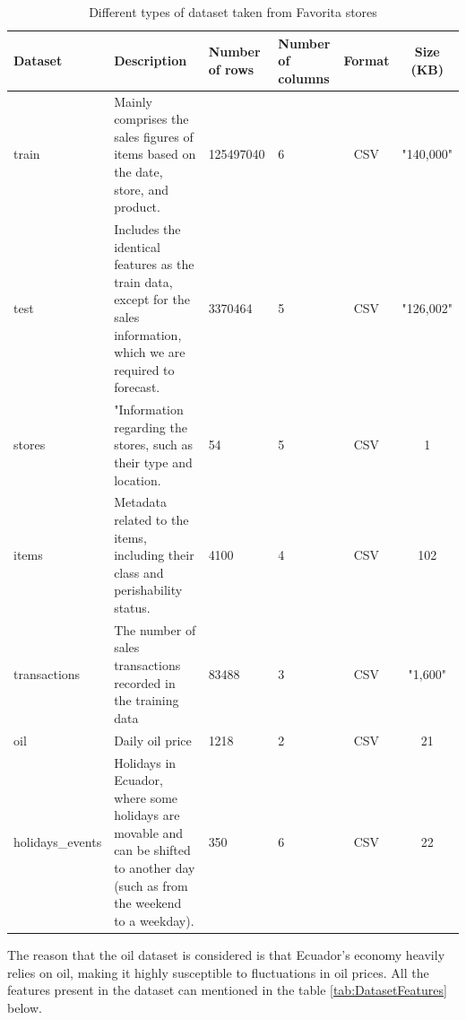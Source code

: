 \begin{table}[p]
	\centering
	\caption{Different types of dataset taken from Favorita stores}
	\label{tab:DatasetType}
	\begin{tabular}{|p{2cm}|p{3cm}|p{2.5cm}|p{2cm}|c|c|}
		\hline
		\textbf{Dataset} & \textbf{Description} & \textbf{Number of rows} & \textbf{Number of columns} & \textbf{Format} & \textbf{Size (KB)} \\ \hline
		train & Mainly comprises the sales figures of items based on the date, store, and product. & 125497040 & 6 & CSV & "140,000" \\ \hline
		test & Includes the identical features as the train data, except for the sales information, which we are required to forecast. & 3370464 & 5 & CSV & "126,002" \\ \hline
		stores & "Information regarding the stores, such as their type and location. & 54 & 5 & CSV & 1 \\ \hline
		items & Metadata related to the items, including their class and perishability status. & 4100 & 4 & CSV & 102 \\ \hline
		transactions & The number of sales transactions recorded in the training data & 83488 & 3 & CSV & "1,600" \\ \hline
		oil & Daily oil price & 1218 & 2 & CSV & 21 \\ \hline
		holidays\_events & Holidays in Ecuador, where some holidays are movable and can be shifted to another day (such as from the weekend to a weekday). & 350 & 6 & CSV & 22 \\ \hline
	\end{tabular}
\end{table}

The reason that the oil dataset is considered is that Ecuador's economy heavily relies on oil, making it highly susceptible to fluctuations in oil prices. All the features present in the dataset can mentioned in the table \ref{tab:DatasetFeatures} below.


